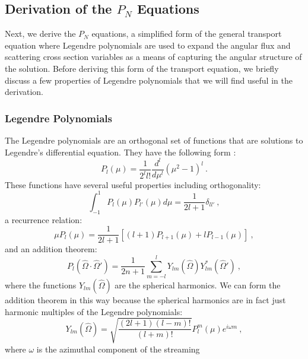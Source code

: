 \documentclass[letterpaper,12pt]{article}
\begin{document}
\subsection{Derivation of the $P_N$ Equations}
\label{subsec:pn_equations}
Next, we derive the $P_N$ equations, a simplified form of the general
transport equation where Legendre polynomials are used to expand the
angular flux and scattering cross section variables as a means of
capturing the angular structure of the solution. Before deriving this
form of the transport equation, we briefly discuss a few properties of
Legendre polynomials that we will find useful in the derivation.

\subsubsection{Legendre Polynomials}
\label{subsubsec:legendre_polys}
The Legendre polynomials are an orthogonal set of functions that
are solutions to Legendre's differential equation. They have the
following form \cite{lewis_computational_1993}:
\begin{equation}
  P_l(\mu) = \frac{1}{2^l l!}\frac{d^l}{d \mu^l}(\mu^2-1)^l\:.
  \label{eq:general_legendre_poly}
\end{equation}
These functions have several useful properties including
orthogonality:
\begin{equation}
  \int_{-1}^{1} P_l(\mu) P_{l'}(\mu) d\mu = \frac{1}{2l+1}\delta_{l l'}\:,
  \label{eq:legendre_orthog}
\end{equation}
a recurrence relation:
\begin{equation}
  \mu P_l(\mu) = \frac{1}{2l+1}[(l+1)P_{l+1}(\mu) + l P_{l-1}(\mu)]\:,
  \label{eq:legendre_recurrence}
\end{equation}
and an addition theorem:
\begin{equation}
  P_l(\hat{\Omega} \cdot \hat{\Omega}') = \frac{1}{2n+1}\sum_{m=-l}^l
  Y_{lm}(\hat{\Omega})Y^*_{lm}(\hat{\Omega}')\:,
  \label{eq:legendre_addition}
\end{equation}
where the functions $Y_{lm}(\hat{\Omega})$ are the spherical
harmonics. We can form the addition theorem in this way because the
spherical harmonics are in fact just harmonic multiples of the
Legendre polynomials:
\begin{equation}
  Y_{lm}(\hat{\Omega}) =
  \sqrt{\frac{(2l+1)(l-m)!}{(l+m)!}}P^m_l(\mu)e^{i \omega m}\:,
  \label{eq:spherical_harmonic}
\end{equation}
where $\omega$ is the azimuthal component of the streaming
\end{document}
